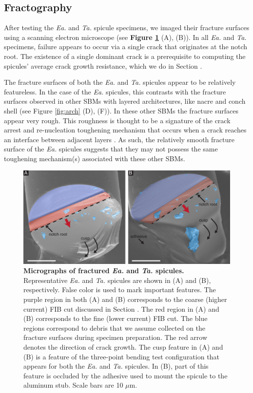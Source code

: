 \documentclass[12pt,onecolumn]{article}
\makeatletter
\DeclareRobustCommand*{\nameref}[1]{%
      \emph{\myorg@nameref{#1}}%
    }%
\newcommand{\TA}{\textit{Ta.\@}\xspace}
\newcommand{\EA}{\textit{Ea.\@}\xspace}
\makeatother
\begin{document}
			
\subsection*{Fractography}
\label{sec:fracto}
 After testing the \EA and \TA spicule specimens, we imaged their fracture surfaces using a scanning electron microscope (see {\bf Figure \ref{fig:fract}} (A), (B)). In all \EA and \TA specimens, failure appears to occur via a single crack that originates at the notch root. The existence of a single dominant crack is a prerequisite to computing the spicules' average crack growth resistance, which we do in Section \nameref{sec:avgR}. 
 
 The fracture surfaces of both the \EA and \TA spicules appear to be relatively featureless. In the case of the \EA spicules, this contrasts with the fracture surfaces observed in other SBMs with layered architectures, like nacre and conch shell (see Figure \ref{fig:arch} (D), (F)). In these other SBMs the fracture surfaces appear very rough. This roughness is thought to be a signature of the crack arrest and re-nucleation toughening mechanism that occurs when a crack reaches an interface between adjacent layers \cite{karambelas2013strombus, koester2008true,liu2000bending,barthelat2009review}. 
 As such, the relatively smooth fracture surface of the \EA spicules suggests that they may not possess the same toughening mechanism(s) associated with these other SBMs.
%
\begin{figure}[hb!]
			\centering
			\includegraphics[width=\textwidth]{../Figures/FigureFract/Figure4_V5.pdf}
			\caption{\textbf{Micrographs of fractured \EA and \TA spicules.} Representative \EA and \TA spicules are shown in (A) and (B), respectively. False color is used to mark important features. The purple region in both (A) and (B) corresponds to the coarse (higher current) FIB cut discussed in Section \nameref{sec:notchconfig}. The red region in (A) and (B) corresponds to the fine (lower current) FIB cut. The blue regions correspond to debris that we assume collected on the fracture surfaces during specimen preparation. The red arrow denotes the direction of crack growth. The cusp feature in (A) and (B) is a feature of the three-point bending test configuration that appears for both the \EA and \TA spicules. In (B), part of this feature is occluded by the adhesive used to mount the spicule to the aluminum stub. Scale bars are 10 $\mu$m.}
			\label{fig:fract}
			\end{figure}
\end{document}
